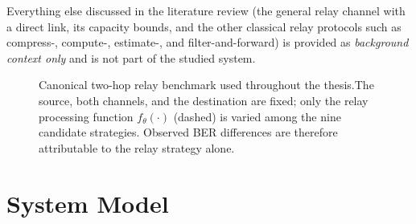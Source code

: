 Everything else discussed in the literature review (the general relay channel with a direct link, its capacity bounds, and the other classical relay protocols such as compress-, compute-, estimate-, and filter-and-forward) is provided as \emph{background context only} and is not part of the studied system.

\begin{figure}[t]
\noindent
{}
\caption{Canonical two-hop relay benchmark used throughout the thesis.The source, both channels, and the destination are fixed; only the relay processing function $f_\theta(\cdot)$ (dashed) is varied among the nine candidate strategies. Observed BER differences are therefore attributable to the relay strategy alone.}
\label{fig:canonical-relay-benchmark}
\end{figure}

\section{System Model}\label{sec:system-model-intro}

